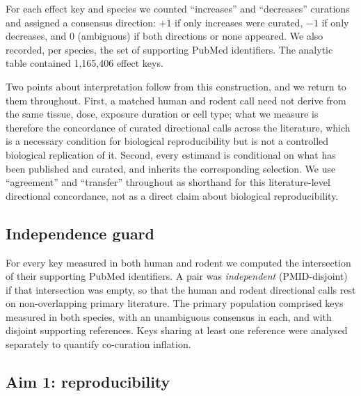 \documentclass[review,12pt,authoryear]{elsarticle}
\begin{document}
For each effect key and species we counted ``increases'' and ``decreases''
curations and assigned a consensus direction: $+1$ if only increases were
curated, $-1$ if only decreases, and $0$ (ambiguous) if both directions or none
appeared. We also recorded, per species, the set of supporting PubMed
identifiers. The analytic table contained 1{,}165{,}406 effect keys.

Two points about interpretation follow from this construction, and we return to
them throughout. First, a matched human and rodent call need not derive from the
same tissue, dose, exposure duration or cell type; what we measure is therefore
the concordance of curated directional calls across the literature, which is a
necessary condition for biological reproducibility but is not a controlled
biological replication of it. Second, every estimand is conditional on what has
been published and curated, and inherits the corresponding selection. We use
``agreement'' and ``transfer'' throughout as shorthand for this literature-level
directional concordance, not as a direct claim about biological reproducibility.

\subsection{Independence guard}

For every key measured in both human and rodent we computed the intersection of
their supporting PubMed identifiers. A pair was \emph{independent} (PMID-disjoint)
if that intersection was empty, so that the human and rodent directional calls
rest on non-overlapping primary literature. The primary population comprised
keys measured in both species, with an unambiguous consensus in each, and with
disjoint supporting references. Keys sharing at least one reference were analysed
separately to quantify co-curation inflation.

\subsection{Aim 1: reproducibility}
\end{document}
